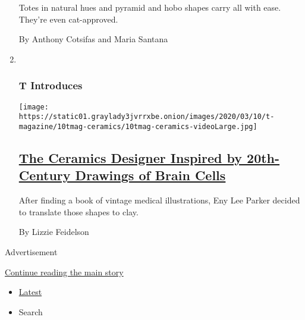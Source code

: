 \begin{enumerate}
  Totes in natural hues and pyramid and hobo shapes carry all with ease.
  They're even cat-approved.

  By Anthony Cotsifas and Maria Santana
\item ~
  \hypertarget{t-introduces}{%
  \subsubsection{T Introduces}\label{t-introduces}}

  \texttt{[image: https://static01.graylady3jvrrxbe.onion/images/2020/03/10/t-magazine/10tmag-ceramics/10tmag-ceramics-videoLarge.jpg]}

  \hypertarget{the-ceramics-designer-inspired-by-20th-century-drawings-of-brain-cells}{%
  \subsection{\texorpdfstring{\href{/2020/03/10/t-magazine/eny-lee-parker.html}{The
  Ceramics Designer Inspired by 20th-Century Drawings of Brain
  Cells}}{The Ceramics Designer Inspired by 20th-Century Drawings of Brain Cells}}\label{the-ceramics-designer-inspired-by-20th-century-drawings-of-brain-cells}}

  After finding a book of vintage medical illustrations, Eny Lee Parker
  decided to translate those shapes to clay.

  By Lizzie Feidelson
\end{enumerate}

Advertisement

\protect\hyperlink{after-mid1}{Continue reading the main story}

\begin{itemize}
\tightlist
\item
  \protect\hyperlink{stream-panel}{Latest}
\item
  Search
\end{itemize}

